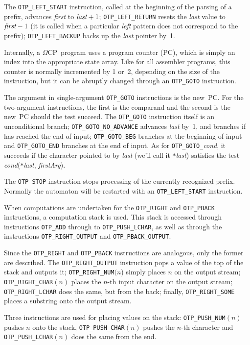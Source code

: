 \documentclass[fleqn]{article}
\newcommand{\OMEGA}{$\Omega$}
\newcommand{\OCP}{\OMEGA CP}
\begin{document}
The \verb|OTP_LEFT_START| instruction, called at the beginning of
the parsing of a prefix, advances \emph{first} to $\emph{last}+1$;  
\verb|OTP_LEFT_RETURN| resets the \emph{last} value to
$\emph{first}-1$ (it is called when a particular \emph{left} pattern
does not correspond to the prefix); \verb|OTP_LEFT_BACKUP| backs up
the \emph{last} pointer by~1.

Internally, a \OCP\ program uses a program counter (PC), which is simply an
index into the appropriate state array.  Like for all assembler
programs, this counter is normally incremented by 1 or~2, depending on
the size of the instruction, but it can be abruptly changed through
an \verb|OTP_GOTO| instruction.

The argument in single-argument \verb|OTP_GOTO| instructions is the
new~PC.  For the two-argument instructions, the first is the comparand
and the second is the new~PC should the test succeed. The
\verb|OTP_GOTO| instruction itself is an unconditional branch;
\verb|OTP_GOTO_NO_ADVANCE| advances \emph{last} by~1, and branches if
has reached the end of input; \verb|OTP_GOTO_BEG| branches at the
beginning of input and \verb|OTP_GOTO_END| branches at the end of
input.  As for \verb|OTP_GOTO_|\emph{cond}, it succeeds if the
character pointed to by \emph{last} (we'll call it
\verb|*|\emph{last}) satisfies the test
\emph{cond}(\verb|*|\emph{last}, \emph{firstArg}).

The \verb|OTP_STOP| instruction stops processing of the currently
recognized prefix.  Normally the automaton will be restarted with an
\verb|OTP_LEFT_START| instruction.

When computations are undertaken for the \verb|OTP_RIGHT| and
\verb|OTP_PBACK| instructions, a computation stack is used.
This stack is accessed through instructions \verb|OTP_ADD| through
to \verb|OTP_PUSH_LCHAR|, as well as through the instructions
\verb|OTP_RIGHT_OUTPUT| and \verb|OTP_PBACK_OUTPUT|.

Since the \verb|OTP_RIGHT| and \verb|OTP_PBACK| instructions are
analogous, only the former are described.
The \verb|OTP_RIGHT_OUTPUT| instruction pops a value of the top of the
stack and outputs it; \verb|OTP_RIGHT_NUM|$(n$) simply places $n$
on the output stream; \verb|OTP_RIGHT_CHAR|$(n)$ places the $n$-th input 
character on the output stream; \verb|OTP_RIGHT_LCHAR| does the same,
but from the back;  finally, \verb|OTP_RIGHT_SOME| places a substring
onto the output stream.

Three instructions are used for placing values on the stack:
\verb|OTP_PUSH_NUM|$(n)$ pushes $n$ onto the stack,
\verb|OTP_PUSH_CHAR|$(n)$ pushes the $n$-th character and
\verb|OTP_PUSH_LCHAR|$(n)$ does the same from the end.
\end{document}
